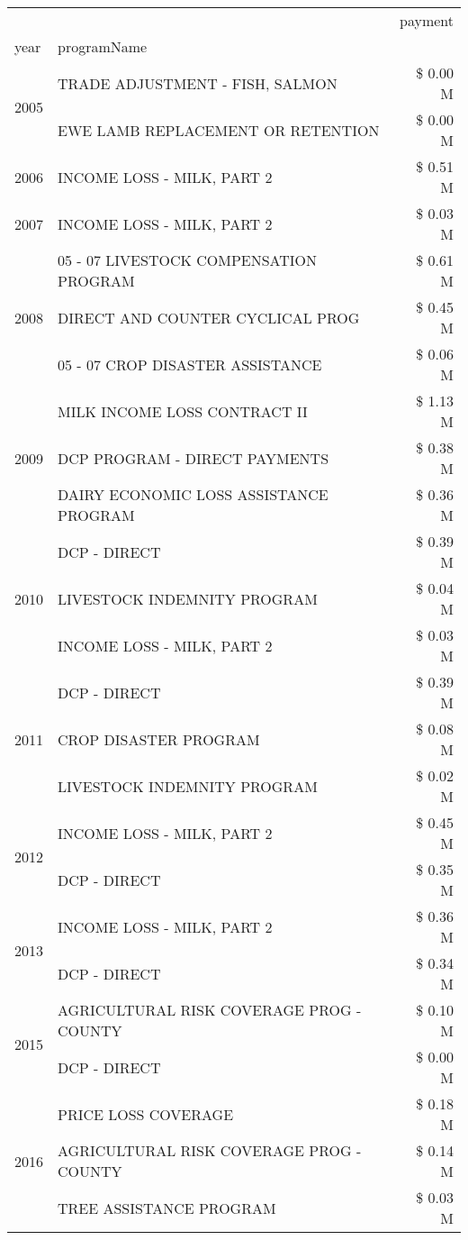 \begin{tabular}{llr}
\toprule
 &  & payment \\
year & programName &  \\
\midrule
\multirow[t]{2}{*}{2005} & TRADE ADJUSTMENT - FISH, SALMON & \$ 0.00 M \\
 & EWE LAMB REPLACEMENT OR RETENTION & \$ 0.00 M \\
\cline{1-3}
2006 & INCOME LOSS - MILK, PART 2 & \$ 0.51 M \\
\cline{1-3}
2007 & INCOME LOSS - MILK, PART 2 & \$ 0.03 M \\
\cline{1-3}
\multirow[t]{3}{*}{2008} & 05 - 07 LIVESTOCK COMPENSATION PROGRAM & \$ 0.61 M \\
 & DIRECT AND COUNTER CYCLICAL PROG & \$ 0.45 M \\
 & 05 - 07 CROP DISASTER ASSISTANCE & \$ 0.06 M \\
\cline{1-3}
\multirow[t]{3}{*}{2009} & MILK INCOME LOSS CONTRACT II & \$ 1.13 M \\
 & DCP PROGRAM - DIRECT PAYMENTS & \$ 0.38 M \\
 & DAIRY ECONOMIC LOSS ASSISTANCE PROGRAM & \$ 0.36 M \\
\cline{1-3}
\multirow[t]{3}{*}{2010} & DCP - DIRECT & \$ 0.39 M \\
 & LIVESTOCK INDEMNITY PROGRAM & \$ 0.04 M \\
 & INCOME LOSS - MILK, PART 2 & \$ 0.03 M \\
\cline{1-3}
\multirow[t]{3}{*}{2011} & DCP - DIRECT & \$ 0.39 M \\
 & CROP DISASTER PROGRAM & \$ 0.08 M \\
 & LIVESTOCK INDEMNITY PROGRAM & \$ 0.02 M \\
\cline{1-3}
\multirow[t]{2}{*}{2012} & INCOME LOSS - MILK, PART 2 & \$ 0.45 M \\
 & DCP - DIRECT & \$ 0.35 M \\
\cline{1-3}
\multirow[t]{2}{*}{2013} & INCOME LOSS - MILK, PART 2 & \$ 0.36 M \\
 & DCP - DIRECT & \$ 0.34 M \\
\cline{1-3}
\multirow[t]{2}{*}{2015} & AGRICULTURAL RISK COVERAGE PROG - COUNTY & \$ 0.10 M \\
 & DCP - DIRECT & \$ 0.00 M \\
\cline{1-3}
\multirow[t]{3}{*}{2016} & PRICE LOSS COVERAGE & \$ 0.18 M \\
 & AGRICULTURAL RISK COVERAGE PROG - COUNTY & \$ 0.14 M \\
 & TREE ASSISTANCE PROGRAM & \$ 0.03 M \\

\end{tabular}

